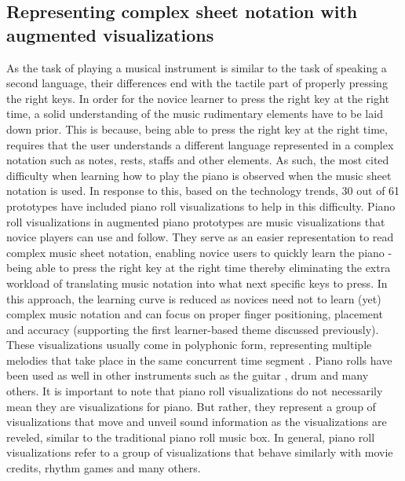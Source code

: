 \documentclass[sigconf, screen, review]{acmart}
\begin{document}
\subsection{Representing complex sheet notation with augmented visualizations}
As the task of playing a musical instrument is similar to the task of speaking a second language, their differences end with the tactile part of properly pressing the right keys. In order for the novice learner to press the right key at the right time, a solid understanding of the music rudimentary elements have to be laid down prior. This is because, being able to press the right key at the right time, requires that the user understands a different language represented in a complex notation such as notes, rests, staffs and other elements. As such, the most cited difficulty when learning how to play the piano is observed when the music sheet notation is used. In response to this, based on the technology trends, 30 out of 61 prototypes have included piano roll visualizations to help in this difficulty. Piano roll visualizations in augmented piano prototypes are music visualizations that novice players can use and follow. They serve as an easier representation to read complex music sheet notation, enabling novice users to quickly learn the piano \cite{walder2016modelling} - being able to press the right key at the right time thereby eliminating the extra workload of translating music notation into what next specific keys to press. In this approach, the learning curve is reduced as novices need not to learn (yet) complex music notation and can focus on proper finger positioning, placement and accuracy (supporting the first learner-based theme discussed previously). These visualizations usually come in polyphonic form, representing multiple melodies that take place in the same concurrent time segment \cite{ciuha2010visualization}.  Piano rolls have been used as well in other instruments such as the guitar \cite{biamonte2010musical}, drum \cite{rossignol2015alternate} and many others. It is important to note that piano roll visualizations do not necessarily mean they are visualizations for piano. But rather, they represent a group of visualizations that move and unveil sound information as the visualizations are reveled, similar to the traditional piano roll music box. In general, piano roll visualizations refer to a group of visualizations that behave similarly with movie credits, rhythm games and many others. 
\end{document}
